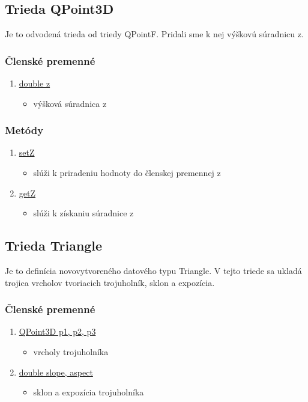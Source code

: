 \documentclass[12pt]{article}
\begin{document}
\subsection{Trieda QPoint3D}
Je to odvodená trieda od triedy QPointF. Pridali sme k nej výškovú súradnicu z. 

\subsubsection{Členské premenné}

\begin{enumerate}
\item[] \underline {double z}
\begin{itemize}
\item výšková súradnica z
\end{itemize}
\end{enumerate}

\subsubsection{Metódy}
\begin{enumerate}
\item[] \underline{setZ}
\begin{itemize}
\item slúži k priradeniu hodnoty do členskej premennej z
\end{itemize}
\item[] \underline{getZ}
\begin{itemize}
\item slúži k získaniu súradnice z
\end{itemize}
\end{enumerate}

\subsection{Trieda Triangle}
Je to definícia novovytvoreného datového typu Triangle. V tejto triede sa ukladá trojica vrcholov tvoriacich trojuholník, sklon a expozícia.

\subsubsection{Členské premenné}
\begin{enumerate}
\item[] \underline {QPoint3D p1, p2, p3}
\begin{itemize}
\item vrcholy trojuholníka
\end{itemize}
\item[] \underline {double slope, aspect}
\begin{itemize}
\item sklon a expozícia trojuholníka
\end{itemize}
\end{enumerate}
\end{document}
